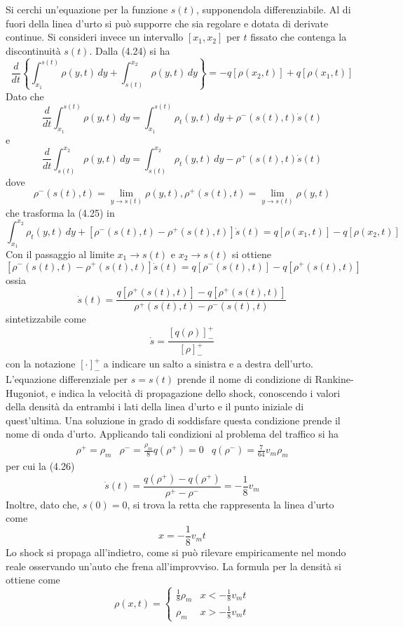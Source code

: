 \documentclass[a4paper,12pt, draft]{article}
\theoremstyle{break}
\numberwithin{equation}{section}
\begin{document}
Si cerchi un'equazione per la funzione \(s(t)\), supponendola differenziabile. Al di fuori della linea d'urto si può supporre che sia regolare e dotata di derivate continue. Si consideri invece un intervallo \([x_1, x_2]\) per \(t\) fissato che contenga la discontinuità \(s(t)\). Dalla (4.24) si ha
\begin{equation}
    \frac{d}{dt} \left\lbrace \int_{x_1}^{s(t)} \rho(y,t) \, dy + \int_{s(t)}^{x_2} \rho(y,t) \, dy\right\rbrace = -q[\rho(x_2, t)] + q[\rho(x_1, t)]
\end{equation}
Dato che 
\[
  \frac{d}{dt} \int_{x_1}^{s(t)} \rho(y,t) \, dy = \int_{x_1}^{s(t)} \rho_t(y, t) \, dy + \rho^{-}(s(t), t)\dot{s}(t)
\]
e
\[
  \frac{d}{dt} \int_{s(t)}^{x_2} \rho(y,t) \, dy = \int_{s(t)}^{x_2} \rho_t(y, t) \, dy - \rho^{+}(s(t), t)\dot{s}(t)
\]
dove 
\[
  \rho^- (s(t), t) = \lim_{y \to s(t)} \rho(y, t), \rho^+ (s(t), t) = \lim_{y \to s(t)} \rho(y,t)
\]
che trasforma la (4.25) in 
\[
\int_{x_1}^{x_2} \rho_t (y,t) \, dy + [\rho^- (s(t), t) - \rho^+ (s(t), t)] \dot{s}(t) = q[\rho(x_1, t)] - q[\rho(x_2,t)]
\]
Con il passaggio al limite \(x_1 \to s(t)\) e \(x_2 \to s(t)\) si ottiene
\[
  [\rho^- (s(t), t) - \rho^+ (s(t), t)] \dot{s}(t) = q[\rho^- (s(t), t)] - q[\rho^+(s(t), t)]
\]
ossia 
\begin{equation}
  \dot{s}(t) = \frac{q[\rho^+(s(t), t)] - q[\rho^+(s(t) ,t)]}{\rho^+(s(t) ,t) - \rho^- (s(t), t)}
\end{equation}
sintetizzabile come
\[
  \dot{s} = \frac{[q(\rho)]^+_-}{[\rho]^+_-}
\]
con la notazione \([\cdot]^+_-\) a indicare un salto a sinistra e a destra dell'urto. \\
L'equazione differenziale per \(s = s(t)\) prende il nome di condizione di Rankine-Hugoniot, e indica la velocità di propagazione dello shock, conoscendo i valori della densità da entrambi i lati della linea d'urto e il punto iniziale di quest'ultima. Una soluzione in grado di soddisfare questa condizione prende il nome di onda d'urto.
Applicando tali condizioni al problema del traffico si ha
\begin{eqnarray*}
  \rho^+ = \rho_m  & \rho^- = \frac{\rho_m}{8}    
  q(\rho^+) = 0 & q(\rho^-) = \frac{7}{64}v_m\rho_m
\end{eqnarray*}
per cui la (4.26) 
\[
  \dot{s}(t) = \frac{q(\rho^+) - q(\rho^+)}{\rho^+ - \rho^-} = -\frac{1}{8}v_m
\]
Inoltre, dato che, \(s(0) = 0\), si trova la retta che rappresenta la linea d'urto come 
\[
  x = -\frac{1}{8}v_m t
\]
Lo shock si propaga all'indietro, come si può rilevare empiricamente nel mondo reale osservando un'auto che frena all'improvviso.
La formula per la densità si ottiene come
\[
\rho(x,t) = \begin{cases}
  \frac{1}{8} \rho_m & x < -\frac{1}{8} v_m t \\
  \rho_m & x > - \frac{1}{8} v_m t
\end{cases}  
\]
\end{document}
